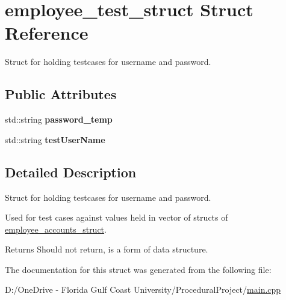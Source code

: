 \hypertarget{structemployee__test__struct}{}\section{employee\+\_\+test\+\_\+struct Struct Reference}
\label{structemployee__test__struct}


Struct for holding testcases for username and password.  


\subsection*{Public Attributes}
\begin{DoxyCompactItemize}
\item 
\mbox{\label{structemployee__test__struct_a1dee3463e1a902aaa3659d970ba3f3d2}} 
std\+::string {\bfseries password\+\_\+temp}
\item 
\mbox{\label{structemployee__test__struct_a3d434731cdf262eb8f68c375a610a720}} 
std\+::string {\bfseries test\+User\+Name}
\end{DoxyCompactItemize}


\subsection{Detailed Description}
Struct for holding testcases for username and password. 

Used for test cases against values held in vector of structs of \mbox{\hyperlink{structemployee__accounts__struct}{employee\+\_\+accounts\+\_\+struct}}.

\begin{DoxyReturn}{Returns}
Should not return, is a form of data structure. 
\end{DoxyReturn}


The documentation for this struct was generated from the following file\+:\begin{DoxyCompactItemize}
\item 
D\+:/\+One\+Drive -\/ Florida Gulf Coast University/\+Procedural\+Project/\mbox{\hyperlink{main_8cpp}{main.\+cpp}}\end{DoxyCompactItemize}
